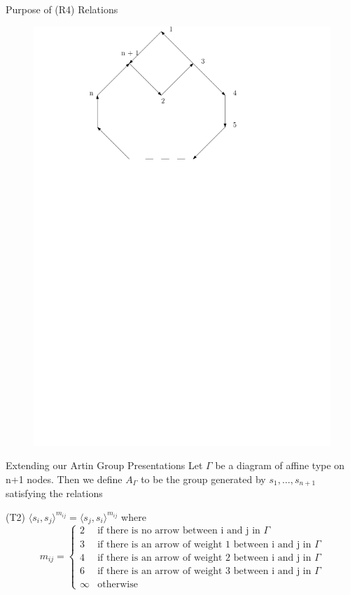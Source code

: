 \documentclass{beamer}
\begin{document}
\begin{frame}{Purpose of (R4) Relations}
\begin{figure}
\includegraphics[scale = .30]{Diagram6.pdf}
\end{figure}
\end{frame}

\begin{frame}{Extending our Artin Group Presentations}
Let $\Gamma$ be a diagram of affine type on n+1 nodes. Then we define $A_{\Gamma}$ to be the group generated by $s_{1}, \dots, s_{n+1}$ satisfying the relations

(T2) $\langle s_{i}, s_{j} \rangle^{m_{ij}} = \langle s_{j}, s_{i} \rangle^{m_{ij}}$ where
$$m_{ij} = 
\begin{cases}
2 &\text{if there is no arrow between i and j in $\Gamma$} \\
3 &\text{if there is an arrow of weight 1 between i and j in $\Gamma$} \\
4 &\text{if there is an arrow of weight 2 between i and j in $\Gamma$} \\
6 &\text{if there is an arrow of weight 3 between i and j in $\Gamma$} \\
\infty &\text{otherwise}
\end{cases}$$
\end{frame}
\end{document}
